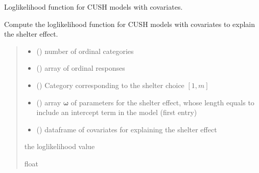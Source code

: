 \documentclass[letterpaper,10pt,english]{sphinxmanual}
\begin{document}

\begin{fulllineitems}
\label{\detokenize{cubmods:cubmods.cush_x.loglik}}
\pysigstartsignatures
{}
\pysigstopsignatures
\sphinxAtStartPar
Log\sphinxhyphen{}likelihood function for CUSH models with covariates.

\sphinxAtStartPar
Compute the log\sphinxhyphen{}likelihood function for CUSH models with covariates 
to explain the shelter effect.
\begin{quote}\begin{description}
\begin{itemize}
\item {} 
\sphinxAtStartPar
{} () \textendash{} number of ordinal categories

\item {} 
\sphinxAtStartPar
{} () \textendash{} array of ordinal responses

\item {} 
\sphinxAtStartPar
{} () \textendash{} Category corresponding to the shelter choice \([1,m]\)

\item {} 
\sphinxAtStartPar
{} () \textendash{} array \(\pmb \omega\) of parameters for the shelter effect, whose length equals 
 to include an intercept term in the model (first entry)

\item {} 
\sphinxAtStartPar
{} () \textendash{} dataframe of covariates for explaining the shelter effect

\end{itemize}

\sphinxAtStartPar
the log\sphinxhyphen{}likelihood value

\sphinxAtStartPar
float

\end{description}\end{quote}

\end{fulllineitems}
\end{document}
